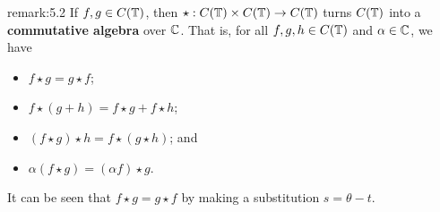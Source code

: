 \begin{remark}{remark:5.2}
    If $f, g \in C(\mathbb{T})$, then $\star : C(\mathbb{T}) \times C(\mathbb{T}) \to C(\mathbb{T})$ 
    turns $C(\mathbb{T})$ into a {\bf commutative algebra} over $\mathbb{C}$. That is, 
    for all $f, g, h \in C(\mathbb{T})$ and $\alpha \in \mathbb{C}$, we have 
    \begin{itemize}
        \item $f \star g = g \star f$; 
        \item $f \star (g + h) = f \star g + f \star h$; 
        \item $(f \star g) \star h = f \star (g \star h)$; and 
        \item $\alpha(f \star g) = (\alpha f) \star g$. 
    \end{itemize}
    It can be seen that $f \star g = g \star f$ by making a substitution 
    $s = \theta - t$. 
\end{remark}

